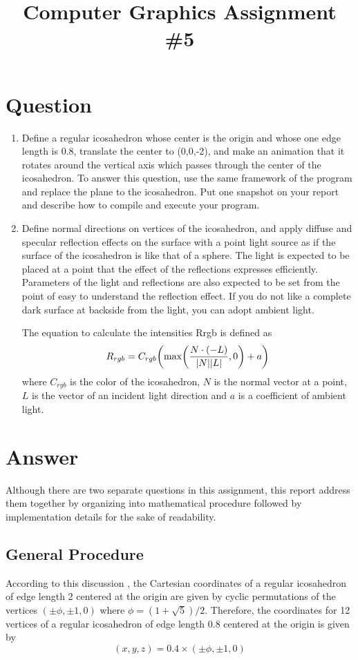 

\usepackage{subfiles}
\usepackage{subcaption}
\usepackage{hyperref}

\title{Computer Graphics Assignment \#5}

\section{Question}
\begin{enumerate}
    \item Define a regular icosahedron whose center is the origin and whose one edge length is 0.8, translate the center to (0,0,-2), and make an animation that it rotates around the vertical axis which passes through the center of the icosahedron. To answer this question, use the same framework of the program and replace the plane to the icosahedron. Put one snapshot on your report and describe how to compile and execute your program.
    \item Define normal directions on vertices of the icosahedron, and apply diffuse and specular reflection effects on the surface with a point light source as if the surface of the icosahedron is like that of a sphere. The light is expected to be placed at a point that the effect of the reflections expresses efficiently. Parameters of the light and reflections are also expected to be set from the point of easy to understand the reflection effect. If you do not like a complete dark surface at backside from the light, you can adopt ambient light.
    
    The equation to calculate the intensities Rrgb is defined as
    \begin{equation}
        R_{rgb} = C_{rgb}\parens*{\max \parens*{\frac{{N\cdot{}(-L)}}{{\vert N\vert\vert L\vert}}, 0} + a}
    \end{equation}
    where $C_{rgb}$ is the color of the icosahedron, $N$ is the normal vector at a point, $L$ is the vector of an incident light direction and $a$ is a coefficient of ambient light.
\end{enumerate}

\section{Answer}
Although there are two separate questions in this assignment, this report address them together by organizing into mathematical procedure followed by implementation details for the sake of readability.

\subsection{General Procedure}
According to this discussion \cite{assignment6-ico-wikipedia}, the Cartesian coordinates of a regular icosahedron of edge length 2 centered at the origin are given by cyclic permutations of the vertices $(\pm \phi, \pm 1, 0)$ where $\phi = (1+\sqrt{5}) / 2$. Therefore, the coordinates for 12 vertices of a regular icosahedron of edge length 0.8 centered at the origin is given by
\begin{equation}
    (x,y,z) = 0.4 \times (\pm \phi, \pm 1, 0)
\end{equation}

